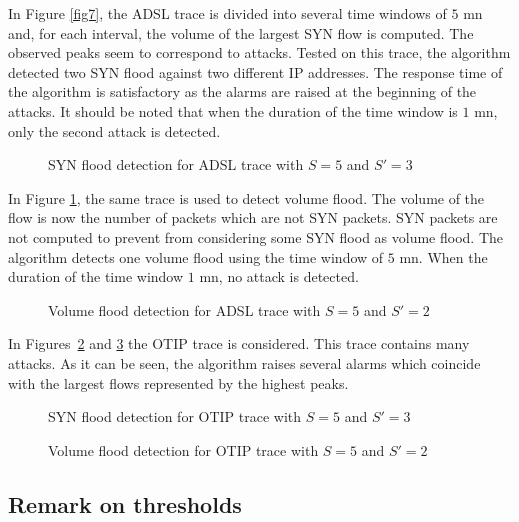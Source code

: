 \documentclass{amsart}
\begin{document}
In Figure \ref{fig7},  the ADSL trace is  divided into several time windows  of $5$ mn and,
for each interval, the volume of the largest SYN flow is computed. The observed peaks seem
to correspond to  attacks. Tested on this trace, the algorithm  detected two SYN flood
against two different IP addresses. The  response time of the algorithm is satisfactory as
the alarms are  raised at the beginning of  the attacks. It should be noted  that when the
duration of the time window is $1$ mn, only the second attack is detected.

\begin{figure}[hbtp]
\caption{SYN flood detection for ADSL  trace with $S{=}5$ and $S'{=}3 \label{fig7}$}
\end{figure}

In Figure \ref{fig8}, the same trace is used to detect volume flood. The
volume of the flow is now the number of packets which are not SYN packets. SYN packets are not computed
to prevent from considering some SYN flood as volume flood. The algorithm detects one
volume flood using the time window of $5$ mn. When the duration of the time window
$1$ mn, no attack is detected. 

\begin{figure}[hbtp]
\caption{Volume flood detection for ADSL trace with $S{=}5$ and $S{'}{=}2$ \label{fig8}}
\end{figure}

In Figures~\ref{fig9} and \ref{fig10} the OTIP trace is considered. This trace contains
many attacks. As it can be seen, the algorithm raises several alarms which coincide with
the largest flows represented by the highest peaks. 
 
\begin{figure}[hbtp]
\caption{SYN flood detection for OTIP trace with $S=5$ and $S'=3$ \label{fig9} }
\end{figure}

\begin{figure}[hbtp]
\caption{Volume flood detection for OTIP trace with $S=5$ and $S'=2$ \label{fig10}}
\end{figure}

\subsection{Remark on thresholds}
\end{document}
